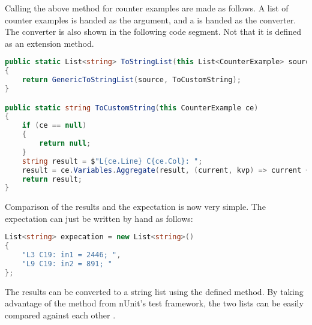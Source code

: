 Calling the above method for counter examples are made as follows. A list of counter examples is handed as the argument, and a  is handed as the converter. The converter is also shown in the following code segment. Not that it is defined as an extension method.

\begin{lstlisting}[language=csharp, caption={Converting CounterExamples to strings}, captionpos=b, label={lst:converterCEToString}]
public static List<string> ToStringList(this List<CounterExample> source)
{
    return GenericToStringList(source, ToCustomString);
}

public static string ToCustomString(this CounterExample ce)
{
    if (ce == null)
    {
        return null;
    }
    string result = $"L{ce.Line} C{ce.Col}: ";
    result = ce.Variables.Aggregate(result, (current, kvp) => current + $"{kvp.Key} = {kvp.Value}; ");
    return result;
}
\end{lstlisting}

Comparison of the results and the expectation is now very simple. The expectation can just be written by hand as follows:

\begin{lstlisting}[language=csharp, caption={Expectation}, captionpos=b, label={lst:testexpectation}]
List<string> expecation = new List<string>()
{
    "L3 C19: in1 = 2446; ",
    "L9 C19: in2 = 891; "
};
\end{lstlisting}

The results can be converted to a string list using the defined  method. By taking advantage of the method  from nUnit's test framework, the two lists can be easily compared against each other \cite{nunitCollectionAssert}.


